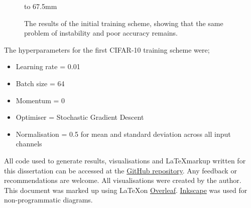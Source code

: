\begin{figure}[p]
{    }
    \hspace{0mm}
    \hbox to 67.5mm{}%
    \caption[The results of the initial training scheme for CIFAR-10.]{The results of the initial training scheme, showing that the same problem of instability and poor accuracy remains.}
    \label{fig:cifar_training_scheme_1}
\end{figure}


The \gls{hyperparameter}s for the first CIFAR-10 training scheme were;

\begin{itemize}
    \item Learning rate = 0.01
    \item Batch size = 64
    \item Momentum = 0
    \item Optimiser = Stochastic Gradient Descent
    \item Normalisation = 0.5 for mean and standard deviation across all input channels
\end{itemize}

\bigskip
All code used to generate results, visualisations and \LaTeX markup written for this dissertation can be accessed at the \href{https://github.com/MattSkiff/Flip-Probability-as-a-Loss-Function-in-Convolutional-Neural-Networks-for-Image-Classification}{GitHub repository}. Any feedback or recommendations are welcome. All visualisations were created by the author. This document was marked up using \LaTeX on \href{https://www.overleaf.com/}{Overleaf}. \href{https://inkscape.org/}{Inkscape} was used for non-programmatic diagrams.